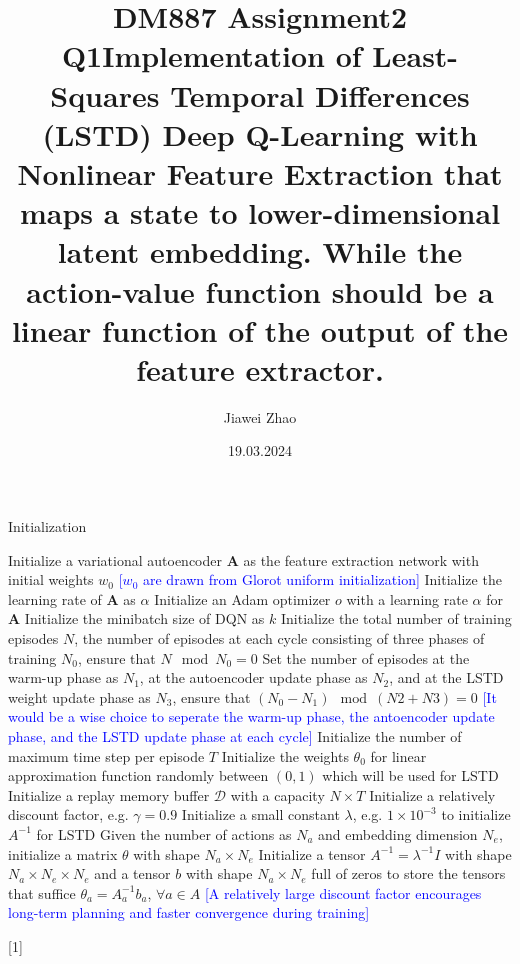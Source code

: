 \documentclass[a4paper,12pt,oneside]{article}
\numberwithin{equation}{section}
\begin{document}
\title{DM887 Assignment2 Q1}
\author{Jiawei Zhao}
\date{19.03.2024}
\maketitle
\title {Implementation of Least-Squares Temporal Differences (LSTD) Deep Q-Learning with Nonlinear Feature Extraction that maps a state to lower-dimensional latent embedding. While the action-value function should be a linear function of the output of the feature extractor.}

\newcommand{\mycomment}[1]{{\fontfamily{lmss}\selectfont\textcolor{blue}{[#1]}}} %
    \begin{algorithm}
        \begin{algorithmic}[1]
        \caption{Initialization}
        \State Initialize a variational autoencoder $\mathbf{A}$ as the feature extraction network with initial weights \(w_0\)
        \mycomment {\(w_0\) are drawn from Glorot uniform initialization}
        \State Initialize the learning rate of $\mathbf{A}$ as $\alpha$ 
        \State Initialize an Adam optimizer \(o\) with a learning rate $\alpha$ for $\mathbf{A}$
        \State Initialize the minibatch size of DQN as \(k\) 
        \State Initialize the total number of training episodes \(N\), the number of episodes at each cycle consisting of three phases of training $N_0$, ensure that $N \mod N_0 = 0$
        \State Set the number of episodes at the warm-up phase as \(N_1\), at the autoencoder update phase as \(N_2\), and at the LSTD weight update phase as \(N_3\), ensure that $(N_0-N_1) \mod (N2+N3) = 0$
        \mycomment {It would be a wise choice to seperate the warm-up phase, the antoencoder update phase, and the LSTD update phase at each cycle}
        \State Initialize the number of maximum time step per episode \(T\)
        \State Initialize the weights $\theta_0$ for linear approximation function randomly between $(0, 1)$ which will be used for LSTD
        \State Initialize a replay memory buffer $\mathcal{D}$ with a capacity \(N \times T\)
        \State Initialize a relatively discount factor, e.g. $\gamma = 0.9$ 
        \State Initialize a small constant $\lambda$, e.g. $1 \times 10^{-3}$ to initialize $A^{-1}$ for LSTD
        \State Given the number of actions as \(N_a\) and embedding dimension \(N_e\), initialize a matrix $\theta$ with shape $N_a \times N_e$
        \State Initialize a tensor $A^{-1} = \lambda^{-1}I$ with shape $N_a \times N_e \times N_e $ and a tensor $b$ with shape $N_a \times N_e$ full of zeros to store the tensors that suffice $\theta_{a} = A_a^{-1} b_a$, $\forall a \in A$
        \mycomment{A relatively large discount factor encourages long-term planning and faster convergence during training}
        \end{algorithmic}[1]
    \end{algorithm}
        
\end{document}

